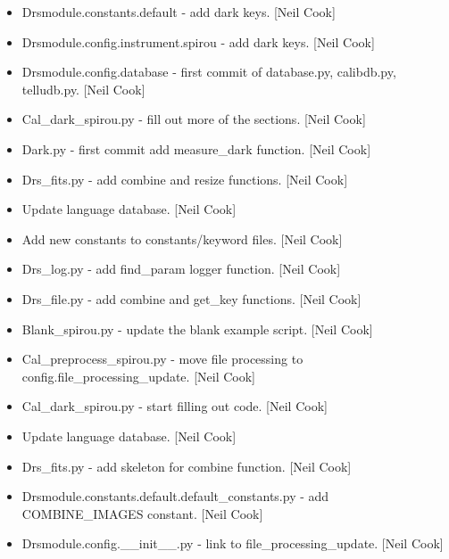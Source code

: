 \documentclass[a4paper,10pt,english]{report}
\begin{document}
\begin{itemize}
\item {} 
Drsmodule.constants.default - add dark keys. {[}Neil Cook{]}

\item {} 
Drsmodule.config.instrument.spirou - add dark keys. {[}Neil Cook{]}

\item {} 
Drsmodule.config.database - first commit of database.py, calibdb.py,
telludb.py. {[}Neil Cook{]}

\item {} 
Cal\_dark\_spirou.py - fill out more of the sections. {[}Neil Cook{]}

\item {} 
Dark.py - first commit add measure\_dark function. {[}Neil Cook{]}

\item {} 
Drs\_fits.py - add combine and resize functions. {[}Neil Cook{]}

\item {} 
Update language database. {[}Neil Cook{]}

\item {} 
Add new constants to constants/keyword files. {[}Neil Cook{]}

\item {} 
Drs\_log.py - add find\_param logger function. {[}Neil Cook{]}

\item {} 
Drs\_file.py - add combine and get\_key functions. {[}Neil Cook{]}

\item {} 
Blank\_spirou.py - update the blank example script. {[}Neil Cook{]}

\item {} 
Cal\_preprocess\_spirou.py - move file processing to
config.file\_processing\_update. {[}Neil Cook{]}

\item {} 
Cal\_dark\_spirou.py - start filling out code. {[}Neil Cook{]}

\item {} 
Update language database. {[}Neil Cook{]}

\item {} 
Drs\_fits.py - add skeleton for combine function. {[}Neil Cook{]}

\item {} 
Drsmodule.constants.default.default\_constants.py - add COMBINE\_IMAGES
constant. {[}Neil Cook{]}

\item {} 
Drsmodule.config.\_\_init\_\_.py - link to file\_processing\_update. {[}Neil
Cook{]}


\end{itemize}
\end{document}
